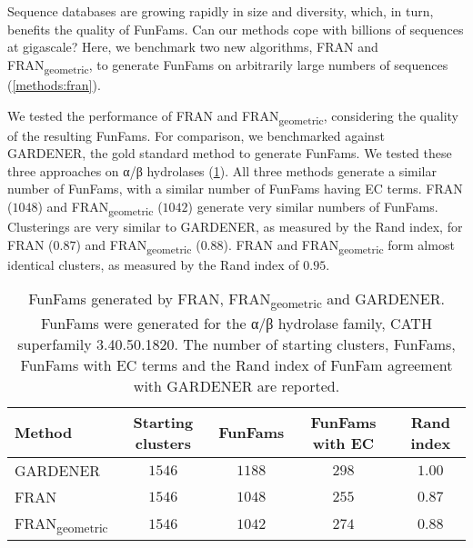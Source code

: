 Sequence databases are growing rapidly in size and diversity, which, in turn, benefits the quality of FunFams. Can our methods cope with billions of sequences at gigascale? Here, we benchmark two new algorithms, FRAN and FRAN\textsubscript{geometric}, to generate FunFams on arbitrarily large numbers of sequences (\ref{methods:fran}).

We tested the performance of FRAN and FRAN\textsubscript{geometric}, considering the quality of the resulting FunFams. For comparison, we benchmarked against GARDENER, the gold standard method to generate FunFams.
We tested these three approaches on α/β hydrolases (\ref{tab:fran}).
All three methods generate a similar number of FunFams, with a similar number of FunFams having EC terms.
FRAN ($1048$) and FRAN\textsubscript{geometric} ($1042$) generate very similar numbers of FunFams.
Clusterings are very similar to GARDENER, as measured by the Rand index, for FRAN ($0.87$) and FRAN\textsubscript{geometric} ($0.88$). FRAN and FRAN\textsubscript{geometric} form almost identical clusters, as measured by the Rand index of $0.95$.

\begin{table}[hbt!]
    \centering
    \caption{%
        FunFams generated by FRAN, FRAN\textsubscript{geometric} and GARDENER.
        FunFams were generated for the α/β hydrolase family,
        CATH superfamily 3.40.50.1820.
        The number of starting clusters, FunFams, FunFams with EC terms and
        the Rand index of FunFam agreement with GARDENER are reported.
    }
    \label{tab:fran}
    \begin{tabular}{lcccc}
        \toprule
        \textbf{Method} & \textbf{Starting clusters} & \textbf{FunFams} & \textbf{FunFams with EC} & \textbf{Rand index} \\
        \midrule
        GARDENER & $1546$ & $1188$ & $298$ & $1.00$ \\
        FRAN & $1546$ & $1048$ & $255$ & $0.87$ \\
        FRAN\textsubscript{geometric} & $1546$ & $1042$ & $274$ & $0.88$ \\
        \bottomrule
    \end{tabular}
\end{table}

